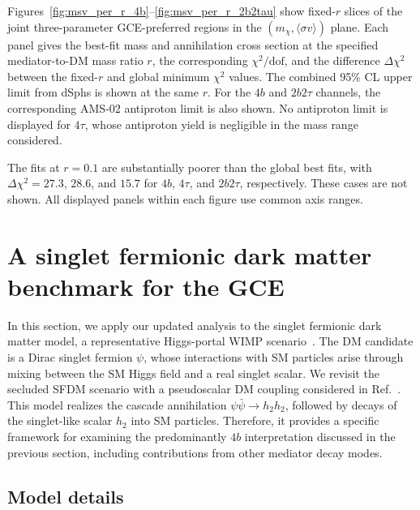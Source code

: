 \documentclass[superscriptaddress,
showpacs,preprintnumbers,nofootinbib,eqsecnum,amsmath,amssymb,aps,11pt, groupedaddress, floatfix]{revtex4-2}
\begin{document}
Figures~\ref{fig:msv_per_r_4b}--\ref{fig:msv_per_r_2b2tau} show fixed-$r$ slices of the joint three-parameter GCE-preferred regions in the $(m_\chi,\langle\sigma v\rangle)$ plane.
Each panel gives the best-fit mass and annihilation cross section at the specified mediator-to-DM mass ratio $r$, the corresponding $\chi^2/\mathrm{dof}$, and the difference $\Delta\chi^2$ between the fixed-$r$ and global minimum
$\chi^2$ values.
The combined 95\% CL upper limit from dSphs is shown at the same $r$.
For the $4b$ and $2b2\tau$ channels, the corresponding
AMS-02 antiproton limit is also shown.
No antiproton limit is displayed for $4\tau$, whose antiproton yield is negligible in the mass range considered.

The fits at $r=0.1$ are substantially poorer than the
global best fits, with $\Delta\chi^2=27.3$, $28.6$, and
$15.7$ for $4b$, $4\tau$, and $2b2\tau$, respectively.
These cases are not shown.
All displayed panels within each figure use common axis ranges.





\section{A singlet fermionic dark matter benchmark for the GCE}
\label{sec:SFDM}


In this section, we apply our updated analysis to the singlet
fermionic dark matter model, a representative Higgs-portal
WIMP scenario~\cite{Kim:2008pp,Kim:2009ke}.
The DM candidate is a Dirac singlet fermion $\psi$, whose
interactions with SM particles arise through mixing between
the SM Higgs field and a real singlet scalar.
We revisit the secluded SFDM scenario with a pseudoscalar
DM coupling considered in Ref.~\cite{Kim:2016csm}.
This model realizes the cascade annihilation
$\psi \bar \psi \to h_2 h_2$, followed by decays of the singlet-like scalar $h_2$ into SM particles.
Therefore, it provides a specific framework for examining the predominantly $4b$ interpretation discussed in the previous section, including contributions from other
mediator decay modes. 



\subsection{Model details}
\end{document}
